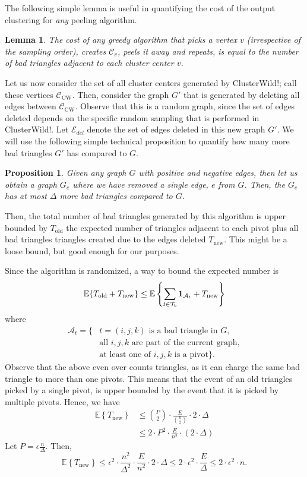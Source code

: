\documentclass{article} %
\newtheorem{prop}{Proposition}
\newtheorem{lem}{Lemma}
\newcommand{\Tb}{\mathcal{T}_b}
\begin{document}
The following simple lemma is useful in quantifying the cost of the output clustering for {\it any} peeling algorithm.

\begin{lem}
The cost of any greedy algorithm that picks a vertex $v$  (irrespective of the sampling order), creates $\mathcal{C}_v$, peels it away and repeats, is equal to the number of bad triangles adjacent to each cluster center $v$.
\end{lem}


Let us now consider the set of all cluster centers generated by ClusterWild!; call these vertices $\mathcal{C}_{\text{CW}}$.
Then, consider the graph $G'$ that is generated by deleting all edges between $\mathcal{C}_{\text{CW}}$.
Observe that this is a random graph, since the set of edges deleted depends on the specific random sampling that is performed in ClusterWild!.
Let $\mathcal{E}_{del}$ denote the set of edges deleted in this new graph $G'$.
We will use the following simple technical proposition to quantify how many more bad triangles $G'$ has compared to $G$.

\begin{prop}
Given any graph $G$ with positive and negative edges, then let us obtain a graph $G_e$ where we have removed a single edge, $e$ from $G$.
Then, the $G_e$ has at most $\Delta$ more bad triangles compared to $G$.
\end{prop}


Then, the total number of bad triangles generated by this algorithm is upper bounded by $T_{\text{old}}$ the expected number of triangles adjacent to each pivot plus all bad triangles triangles created due to the edges deleted $T_{\text{new}}$.
This might be a loose bound, but good enough for our purposes.


Since the algorithm is randomized, a way to bound the expected number is
\begin{equation}
\mathbb{E}\{T_{\text{old}}+T_{\text{new}}\} \le \mathbb{E}\left\{\sum_{t\in\Tb} {\bf 1}_{\mathcal{A}_t}+T_{\text{new}}\right\}
\end{equation}
where
\begin{align*}
\mathcal{A}_t = \{&\text{$t=(i,j,k)$ is a bad triangle in $G$}, \\
&\text{all $i,j,k$ are part of the current graph}, \\
&\text{at least one of $i,j,k$ is a pivot}\}.
\end{align*}
Observe that the above even over counts triangles, as it can charge the same bad triangle to more than one pivots.
This means that the event of an old triangles picked by a single pivot, is upper bounded by the event that it is picked by multiple pivots.
Hence, we have
\begin{align}
\mathbb{E}\left\{T_{\text{new}}\right\}& \le {P\choose 2} \cdot \frac{E}{{n \choose 2}}\cdot 2\cdot \Delta \\
&\le 2\cdot P^2\cdot \frac{E}{n^2}\cdot (2\cdot \Delta)
\end{align}
Let $P= \epsilon \frac{n}{\Delta}$.
Then,
$$\mathbb{E}\left\{T_{\text{new}}\right\} \le \epsilon^2 \cdot \frac{n^2}{\Delta^2}\cdot  \frac{E}{n^2}\cdot 2\cdot \Delta
\le 2\cdot \epsilon^2\cdot \frac{E}{\Delta}
\le 2\cdot \epsilon^2 \cdot n.$$
\end{document}
